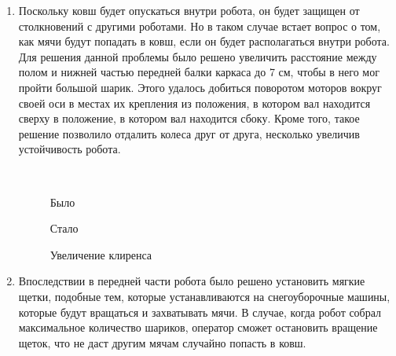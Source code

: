 \begin{enumerate}
\begin{enumerate}
      \item Поскольку ковш будет опускаться внутри робота, он будет защищен от столкновений с другими роботами. Но в таком случае встает вопрос о том, как мячи будут попадать в ковш, если он будет располагаться внутри робота. Для решения данной проблемы было решено увеличить расстояние между полом и нижней частью передней балки каркаса до 7 см, чтобы в него мог пройти большой шарик. Этого удалось добиться поворотом моторов вокруг своей оси в местах их крепления из положения, в котором вал находится сверху в положение, в котором вал находится сбоку. Кроме того, такое решение позволило отдалить колеса друг от друга, несколько увеличив устойчивость робота.
      
      \begin{figure}[H]
      	\begin{minipage}[h]{1\linewidth}
      	\end{minipage}
      	\vfill
      	\begin{minipage}[h]{0.25\linewidth}
      		\center  
      	\end{minipage}
      	\begin{minipage}[h]{0.25\linewidth}
      		\caption{Было}
      	\end{minipage}
      	\begin{minipage}[h]{0.25\linewidth}
      		\caption{Стало}
      	\end{minipage}
      	\caption{Увеличение клиренса}
      \end{figure}
        
      \item Впоследствии в передней части робота было решено установить мягкие щетки, подобные тем, которые устанавливаются на снегоуборочные машины, которые будут вращаться и захватывать мячи. В случае, когда робот собрал максимальное количество шариков, оператор сможет остановить вращение щеток, что не даст другим мячам случайно попасть в ковш.
      

\end{enumerate}
\end{enumerate}
